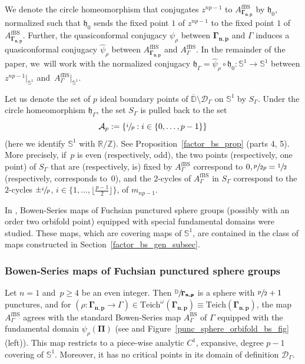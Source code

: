 \documentclass[JEP,XML,SOM,Unicode,NoFloatCountersInSection,published]{cedram}
\let\faktor\sfrac
\theoremstyle{definition}
\theoremstyle{remark}
\newcommand{\D}{\mathbb{D}}
\newcommand{\R}{\mathbb{R}}
\newcommand{\Z}{\mathbb{Z}}
\begin{document}
We denote the circle homeomorphism that conjugates $z^{np-1}$ to $A_{\pmb{\Gamma_{n,p}}}^{\mathrm{fBS}}$ by $\mathfrak{h}_0$, normalized such that $\mathfrak{h}_0$ sends the fixed point $1$ of $z^{np-1}$ to the fixed point $1$ of $A_{\pmb{\Gamma_{n,p}}}^{\mathrm{fBS}}$. Further, the quasiconformal conjugacy $\psi_\rho$ between $\pmb{\Gamma_{n,p}}$ and $\Gamma$ induces a quasiconformal conjugacy $\widehat{\psi}_\rho$ between $A_{\pmb{\Gamma_{n,p}}}^{\mathrm{fBS}}$ and $A_{\Gamma}^{\mathrm{fBS}}$.
In the remainder of the paper, we~will work with the normalized conjugacy $\mathfrak{h}_\Gamma=\widehat{\psi}_\rho\circ\mathfrak{h}_0:\mathbb{S}^1\to\mathbb{S}^1$ between $z^{np-1}\vert_{\mathbb{S}^1}$ and~$A_{\Gamma}^{\mathrm{fBS}}\vert_{\mathbb{S}^1}$.

Let us denote the set of $p$ ideal boundary points of $\overline{\D}\setminus \mathcal{D}_{\Gamma}$ on $\mathbb{S}^1$ by $S_{\Gamma}$.
Under the circle homeomorphism $\mathfrak{h}_\Gamma$, the set $S_{\Gamma}$ is pulled back to the set
\[
\displaystyle\mathcal{A}_p:=\{\sfrac{i}{p}:i\in\{0,\dots,p-1\}\}
\]
(here we identify $\mathbb{S}^1$ with $\R/\Z$). See Proposition~\ref{factor_bs_prop} (parts 4, 5). More precisely, if~$p$ is even (respectively, odd), the two points (respectively, one point) of $S_{\Gamma}$ that are (respectively, is) fixed by $A_{\Gamma}^{\mathrm{fBS}}$ correspond to $0,\sfrac{p}{2p}=\sfrac{1}{2}$ (respectively, corresponds to~$0$), and the $2$-cycles of $A_{\Gamma}^{\mathrm{fBS}}$ in $S_{\Gamma}$ correspond to the $2$-cycles $\pm \sfrac{i}{p}$, $i\in\{1,\dots,\lfloor \frac{p-1}{2}\rfloor\}$, of $m_{np-1}$.

\label{punc_sphere_bs_subsec}

In \cite{MM1,sullivan_survey}, Bowen-Series maps of Fuchsian punctured sphere groups (possibly with an order two orbifold point) equipped with special fundamental domains were studied. These maps, which are covering maps of $\mathbb{S}^1$, are contained in the class of maps constructed in Section~\ref{factor_bs_gen_subsec}.

\subsubsection{Bowen-Series maps of Fuchsian punctured sphere groups}\label{bs_1_subsubsec}

Let $n\!=\!1$ and~\hbox{$p\!\geq\! 4$} be an even integer. Then $\faktor{\D}{\pmb{\Gamma_{n,p}}}$ is a sphere with $\sfrac{p}{2}+1$ punctures, and for \hbox{$(\rho: \pmb{\Gamma_{n,p}}\to\Gamma)\in \mathrm{Teich}^\omega(\pmb{\Gamma_{n,p}}) \equiv \mathrm{Teich}(\pmb{\Gamma_{n,p}})$}, the map $A_{\Gamma}^{\mathrm{fBS}}$ agrees with the standard Bowen-Series map $A_{\Gamma}^{\mathrm{BS}}$ of $\Gamma$ equipped with the fundamental domain $\psi_\rho(\pmb{\Pi})$ (see \cite[\S 3]{MM1} and Figure~\ref{punc_sphere_orbifold_bs_fig}(left)). This map restricts to a piece-wise analytic $C^1$, expansive, degree $p-1$ covering of $\mathbb{S}^1$. Moreover, it has no critical points in its domain of definition $\mathcal{D}_{\Gamma}$.
\end{document}
